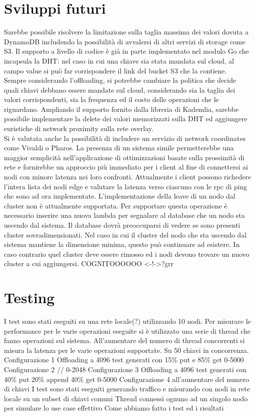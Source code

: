 \documentclass[conference]{IEEEtran}
\begin{document}
\section{Sviluppi futuri}
Sarebbe possibile risolvere la limitazione sulla taglia massima dei valori dovuta a DynamoDB includendo la possibilità di
avvalersi di altri servizi di storage come S3. Il supporto a livello di codice è già in parte implementato nel modulo Go
che incapsula la DHT: nel caso in cui una chiave sia stata mandata sul cloud, al campo value si può far corrispondere il
link del bucket S3 che la contiene.\\
Sempre considerando l'offloading, si potrebbe cambiare la politica che decide quali chiavi debbano essere mandate sul cloud,
considerando sia la taglia dei valori corrispondenti, sia la frequenza ed il costo delle operazioni che le riguardano.
Ampliando il supporto fornito dalla libreria di Kademlia, sarebbe possibile implementare la delete dei valori memorizzati
sulla DHT ed aggiungere euristiche di network proximity sulla rete overlay.\cite{kadRTT}\\
Si è valutata anche la possibilità di includere un servizio di network coordinates come Vivaldi\cite{vivaldi} o Pharos.\cite{pharos}
La presenza di un sistema simile permetterebbe una maggior semplicità nell'applicazione di ottimizzazioni basate sulla
prossimità di rete e fornirebbe un approccio più immediato per i client al fine di connettersi ai nodi con minore latenza
nei loro confronti. Attualmente i client possono richedere l'intera lista dei nodi edge e valutare la latenza verso ciascuno
con le rpc di ping che sono ad ora implementate.
L'implementazione della leave di un nodo dal cluster non è attualmente supportata. Per supportare questa operazione è necessario
inserire una nuova lambda per segnalare al database che un nodo sta uscendo dal sistema. Il database dovrà preoccuparsi di vedere se
sono presenti cluster sovradimensionati. Nel caso in cui il cluster del nodo che sta uscendo dal sistema mantiene la dimensione minima, questo
può continuare ad esistere.
In caso contrario quel cluster deve essere rimosso ed i nodi devono trovare un nuovo cluster a cui aggiungersi.
COGNITOOOOOO <-!->?grr
\section{Testing}
I test sono stati eseguiti su una rete locale(?) utilizzando 10 nodi. Per misurare le performance per le varie operazioni eseguite si è utilizzato
una serie di thread che fanno operazioni sul sistema. All'aumentare del numero di thread concorrenti si misura la latenza per le varie operazioni supportate.
Su 50 chiavi in concorrenza.
Configurazione 1 Offloading a 4096 test generati con 15\% put e 85\% get 0-5000
Configurazione 2 // 0-2048
Configurazione 3 Offloading a 4096 test generati con 40\% put 20\% append 40\% get 0-5000
Configurazione 4 all'aumentare del numero di chiavi
I test sono stati eseguiti generando traffico e misurando con nodi in rete locale su un subset di chiavi comuni
Thread connessi ognuno ad un singolo nodo per simulare lo use case effettivo
Come abbiamo fatto i test ed i risultati
\end{document}
